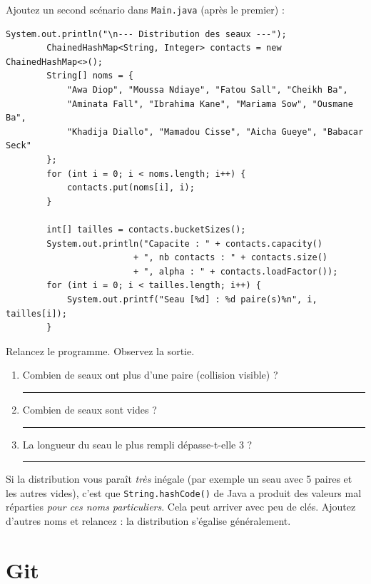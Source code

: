 \documentclass[11pt,a4paper]{article}
\begin{document}
Ajoutez un second scénario dans \texttt{Main.java} (après le premier) :

\begin{lstlisting}[style=java]
        System.out.println("\n--- Distribution des seaux ---");
        ChainedHashMap<String, Integer> contacts = new ChainedHashMap<>();
        String[] noms = {
            "Awa Diop", "Moussa Ndiaye", "Fatou Sall", "Cheikh Ba",
            "Aminata Fall", "Ibrahima Kane", "Mariama Sow", "Ousmane Ba",
            "Khadija Diallo", "Mamadou Cisse", "Aicha Gueye", "Babacar Seck"
        };
        for (int i = 0; i < noms.length; i++) {
            contacts.put(noms[i], i);
        }

        int[] tailles = contacts.bucketSizes();
        System.out.println("Capacite : " + contacts.capacity()
                         + ", nb contacts : " + contacts.size()
                         + ", alpha : " + contacts.loadFactor());
        for (int i = 0; i < tailles.length; i++) {
            System.out.printf("Seau [%d] : %d paire(s)%n", i, tailles[i]);
        }
\end{lstlisting}

\begin{exercicebox}
Relancez le programme. Observez la sortie.
\begin{enumerate}[nosep]
    \item Combien de seaux ont plus d'une paire (collision visible) ? \rule{3cm}{0.4pt}
    \item Combien de seaux sont vides ? \rule{3cm}{0.4pt}
    \item La longueur du seau le plus rempli dépasse-t-elle 3 ? \rule{3cm}{0.4pt}
\end{enumerate}

Si la distribution vous paraît \emph{très} inégale (par exemple un seau avec 5 paires et les autres vides), c'est que \texttt{String.hashCode()} de Java a produit des valeurs mal réparties \emph{pour ces noms particuliers}. Cela peut arriver avec peu de clés. Ajoutez d'autres noms et relancez : la distribution s'égalise généralement.
\end{exercicebox}

\section{Git}
\end{document}
